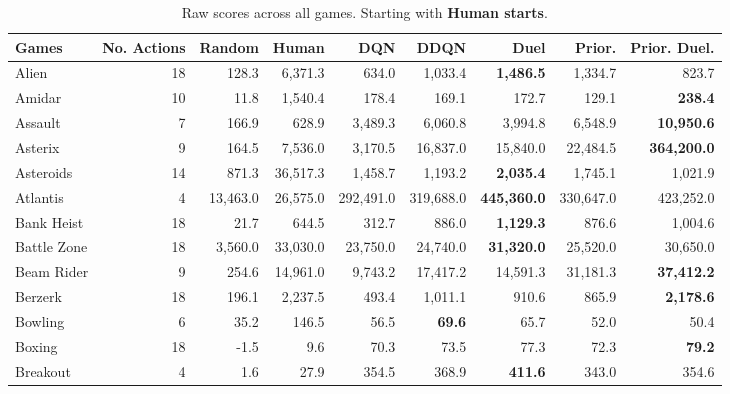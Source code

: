 \begin{table}[t]
\caption{Raw scores across all games. Starting with {\bf Human starts}.}
\footnotesize
\begin{center}
\begin{tabular}{l|rrr|rrr|rr}
    {\sc Games} &  {\sc No. Actions} &     {\sc Random} &     {\sc Human} &        {\sc DQN} &       {\sc DDQN} &       {\sc Duel} &{\sc Prior.} & {\sc Prior. Duel.}\\
\hline
               Alien &              18 &      128.3 &   6,371.3 &      634.0 &    1,033.4 &{\bf1,486.5}&    1,334.7 &        823.7 \\
              Amidar &              10 &       11.8 &   1,540.4 &      178.4 &      169.1 &      172.7 &      129.1 &{\bf238.4}\\
             Assault &               7 &      166.9 &     628.9 &    3,489.3 &    6,060.8 &    3,994.8 &    6,548.9 &{\bf10,950.6}\\
             Asterix &               9 &      164.5 &   7,536.0 &    3,170.5 &   16,837.0 &   15,840.0 &   22,484.5 &{\bf364,200.0}\\
           Asteroids &              14 &      871.3 &  36,517.3 &    1,458.7 &    1,193.2 &{\bf2,035.4}&    1,745.1 &      1,021.9 \\
            Atlantis &               4 &   13,463.0 &  26,575.0 &  292,491.0 &  319,688.0 &{\bf445,360.0}&  330,647.0 &    423,252.0 \\
          Bank Heist &              18 &       21.7 &     644.5 &      312.7 &      886.0 &{\bf1,129.3}&      876.6 &      1,004.6 \\
         Battle Zone &              18 &    3,560.0 &  33,030.0 &   23,750.0 &   24,740.0 &{\bf31,320.0}&   25,520.0 &     30,650.0 \\
          Beam Rider &               9 &      254.6 &  14,961.0 &    9,743.2 &   17,417.2 &   14,591.3 &   31,181.3 &{\bf37,412.2}\\
             Berzerk &              18 &      196.1 &   2,237.5 &      493.4 &    1,011.1 &      910.6 &      865.9 &{\bf2,178.6}\\
             Bowling &               6 &       35.2 &     146.5 &       56.5 &{\bf69.6}&       65.7 &       52.0 &         50.4 \\
              Boxing &              18 &       -1.5 &       9.6 &       70.3 &       73.5 &       77.3 &       72.3 &{\bf79.2}\\
            Breakout &               4 &        1.6 &      27.9 &      354.5 &      368.9 &{\bf411.6}&      343.0 &        354.6 \\

\end{tabular}
\end{center}
\end{table}
